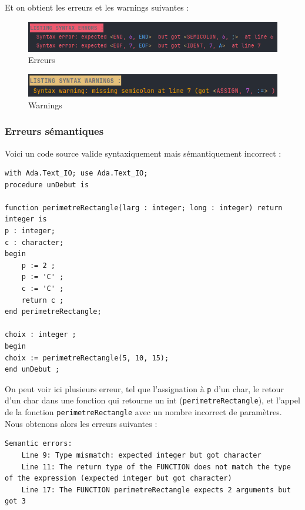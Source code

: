 \documentclass[french,a4paper]{article}
\begin{document}
    Et on obtient les erreurs et les warnings suivantes :

    \begin{figure}[H]
        \centering
        \includegraphics[width=1\textwidth]{syntax_err}
        \caption{Erreurs}\label{fig:figure8}
    \end{figure}

    \begin{figure}[H]
        \centering
        \includegraphics[width=1\textwidth]{syntax_warn}
        \caption{Warnings}\label{fig:figure9}
    \end{figure}
    \subsubsection{Erreurs sémantiques}

    Voici un code source valide syntaxiquement mais sémantiquement incorrect :

    \begin{lstlisting}[label={lst:lstlisting18}]
with Ada.Text_IO; use Ada.Text_IO;
procedure unDebut is

function perimetreRectangle(larg : integer; long : integer) return integer is
p : integer;
c : character;
begin
    p := 2 ;
    p := 'C' ;
    c := 'C' ;
    return c ;
end perimetreRectangle;

choix : integer ;
begin
choix := perimetreRectangle(5, 10, 15);
end unDebut ;
    \end{lstlisting}

    On peut voir ici plusieurs erreur, tel que l'assignation à \texttt{p} d'un char, le retour d'un char dans une fonction qui retourne un int (\texttt{perimetreRectangle}), et l'appel de la fonction \texttt{perimetreRectangle} avec un nombre incorrect de paramètres. \\
    Nous obtenons alors les erreurs suivantes :
    \begin{lstlisting}
Semantic errors:
	Line 9: Type mismatch: expected integer but got character
	Line 11: The return type of the FUNCTION does not match the type of the expression (expected integer but got character)
	Line 17: The FUNCTION perimetreRectangle expects 2 arguments but got 3
    \end{lstlisting}
\end{document}
